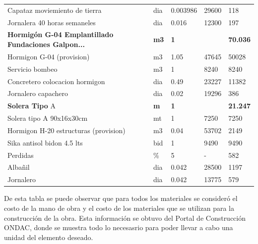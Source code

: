 \documentclass{article} %
\begin{document}
\begin{table}[H]
{\begin{tabular}{lllll}
                         Capataz moviemiento de tierra &    dia &  0.003986 &           29600 &          118 \\
                          Jornalera 40 horas semaneles &    dia &     0.016 &           12300 &          197 \\
    \textbf{Hormigón G-04 Emplantillado Fundaciones Galpon...} & \textbf{m3} & \textbf{1} & \textbf{} & \textbf{70.036} \\
                             Hormigon G-04 (provision) &     m3 &      1.05 &           47645 &        50028 \\
                                       Servicio bombeo &     m3 &         1 &            8240 &         8240 \\
                        Concretero colocacion hormigon &    dia &      0.49 &           23227 &        11382 \\
                                   Jornalero capachero &    dia &      0.02 &           19296 &          386 \\
                                   \textbf{Solera Tipo} A & \textbf{m} & \textbf{1} & \textbf{} & \textbf{21.247} \\
                              Solera tipo A 90x16x30cm &     mt &         1 &            7250 &         7250 \\
                 Hormigon H-20 estructuras (provision) &     m3 &      0.04 &           53702 &         2149 \\
                            Sika antisol bidon 4.5 lts &    bid &         1 &            9490 &         9490 \\
                                              Perdidas &      \% &         5 &               - &          582 \\
                                               Albañil &    dia &     0.042 &           28500 &         1197 \\
                                             Jornalero &    dia &     0.042 &           13775 &          579 \\
    \bottomrule
    \end{tabular}
    }
\end{table}


De esta tabla se puede observar que para todos los materiales se consideró el costo de la mano de obra y el costo de los materiales que se utilizan para la construcción de la obra. Esta información se obtuvo del Portal de Construcción ONDAC, donde se muestra todo lo necesasrio para poder llevar a cabo una unidad del elemento deseado.
\end{document}

